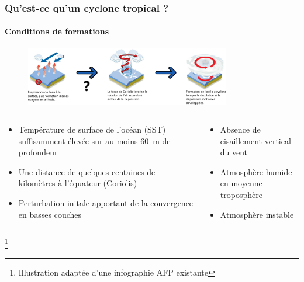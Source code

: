 \documentclass[aspectratio=169, usepdftitle=false, xcolor={dvipsnames}, 9pt,table]{beamer}
\newcommand\blfootnote[1]{%
  \begingroup
  \renewcommand\thefootnote{}\footnote{#1}%
  \addtocounter{footnote}{-1}%
  \endgroup
}
\begin{document}
\begin{frame}[c]
    \frametitle{Qu'est-ce qu'un cyclone tropical ?}
    \framesubtitle{Conditions de formations}
    \begin{figure}[h]
        \centering
        \includegraphics[width=0.8\textwidth]{Figures/diagramme_formation.png}
    \end{figure}
    \footnotesize
    \begin{block}
        \begin{columns}[t]
            \scriptsize
            \begin{column}{0.5\textwidth}
                \begin{itemize}
                   \item Température de surface de l'océan (SST) suffisamment élevée \mbox{\parencite{palmen_formation_1948}} sur au moins 60~m de profondeur 
                   \item Une distance de quelques centaines de kilomètres à l'équateur (Coriolis)
                   \item Perturbation initale apportant de la convergence en basses couches
                \end{itemize}
            \end{column}
            \begin{column}{0.5\textwidth}
               \begin{itemize}
                   \item Absence de cisaillement vertical du vent\\\parencite{gray_global_1968}
                   \item Atmosphère humide en moyenne troposphère
                   \item Atmosphère instable
               \end{itemize} 
            \end{column}
        \end{columns}
    \end{block}
    \blfootnote{Illustration adaptée d'une infographie AFP existante}
\end{frame}
\end{document}
